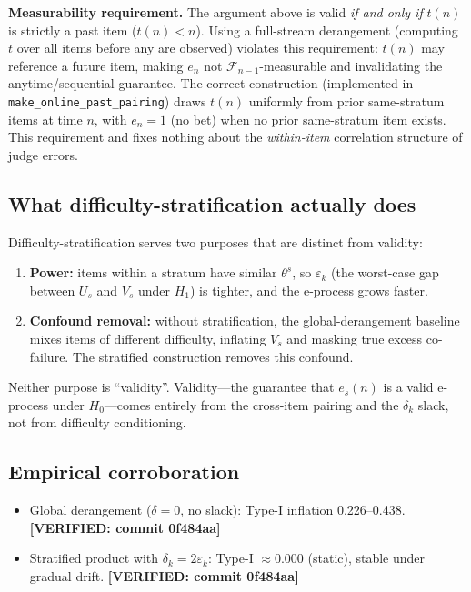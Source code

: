 \documentclass[11pt,a4paper]{article}
\newcommand{\verified}[1]{\textbf{[VERIFIED: #1]}}
\begin{document}
\textbf{Measurability requirement.}
The argument above is valid \emph{if and only if} $t(n)$ is strictly a
past item ($t(n) < n$).  Using a full-stream derangement (computing $t$
over all items before any are observed) violates this requirement: $t(n)$
may reference a future item, making $e_n$ not $\mathcal{F}_{n-1}$-measurable
and invalidating the anytime/sequential guarantee.  The correct construction
(implemented in \texttt{make\_online\_past\_pairing}) draws $t(n)$ uniformly
from prior same-stratum items at time $n$, with $e_n = 1$ (no bet) when
no prior same-stratum item exists.  This requirement and fixes nothing about the
\emph{within-item} correlation structure of judge errors.

\subsection{What difficulty-stratification actually does}

Difficulty-stratification serves two purposes that are distinct from
validity:
\begin{enumerate}[leftmargin=1.5em]
  \item \textbf{Power:} items within a stratum have similar $\theta^s$,
        so $\varepsilon_k$ (the worst-case gap between $U_s$ and $V_s$
        under $H_1$) is tighter, and the e-process grows faster.
  \item \textbf{Confound removal:} without stratification, the
        global-derangement baseline mixes items of different difficulty,
        inflating $V_s$ and masking true excess co-failure.  The
        stratified construction removes this confound.
\end{enumerate}

Neither purpose is ``validity''.  Validity---the guarantee that
$e_s(n)$ is a valid e-process under $H_0$---comes entirely from the
cross-item pairing and the $\delta_k$ slack, not from difficulty
conditioning.

\subsection{Empirical corroboration}

\begin{itemize}[leftmargin=1.5em]
  \item Global derangement ($\delta = 0$, no slack): Type-I
        inflation 0.226--0.438.  \verified{commit 0f484aa}
  \item Stratified product with $\delta_k = 2\varepsilon_k$:
        Type-I $\approx 0.000$ (static), stable under gradual drift.
        \verified{commit 0f484aa}
\end{itemize}
\end{document}
